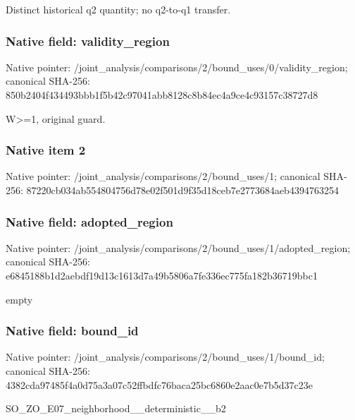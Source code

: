 \documentclass[10pt,a4paper]{article}
\begin{document}
\begingroup\raggedright\sloppy Distinct historical q2 quantity;\allowbreak{} no q2-to-q1 transfer.\par\endgroup

\subsubsection{Native field: validity\_\allowbreak{}region}
Native pointer: /joint\_\allowbreak{}analysis/comparisons/2/bound\_\allowbreak{}uses/0/validity\_\allowbreak{}region; canonical SHA-256: 850b2404f434493bbb1f5b42c97041abb8128c8b84ec4a9ce4c93157c38727d8

\begingroup\raggedright\sloppy W>=\allowbreak{}1,\allowbreak{} original guard.\par\endgroup

\subsubsection{Native item 2}
Native pointer: /joint\_\allowbreak{}analysis/comparisons/2/bound\_\allowbreak{}uses/1; canonical SHA-256: 87220cb034ab554804756d78e02f501d9f35d18ceb7e2773684aeb4394763254

\subsubsection{Native field: adopted\_\allowbreak{}region}
Native pointer: /joint\_\allowbreak{}analysis/comparisons/2/bound\_\allowbreak{}uses/1/adopted\_\allowbreak{}region; canonical SHA-256: e6845188b1d2aebdf19d13c1613d7a49b5806a7fe336ec775fa182b36719bbc1

\begingroup\raggedright\sloppy empty\par\endgroup

\subsubsection{Native field: bound\_\allowbreak{}id}
Native pointer: /joint\_\allowbreak{}analysis/comparisons/2/bound\_\allowbreak{}uses/1/bound\_\allowbreak{}id; canonical SHA-256: 4382cda97485f4a0d75a3a07c52ffbdfc76baca25bc6860e2aac0e7b5d37c23e

\begingroup\raggedright\sloppy SO\_\allowbreak{}ZO\_\allowbreak{}E07\_\allowbreak{}neighborhood\_\allowbreak{}\_\allowbreak{}deterministic\_\allowbreak{}\_\allowbreak{}b2\par\endgroup
\end{document}
